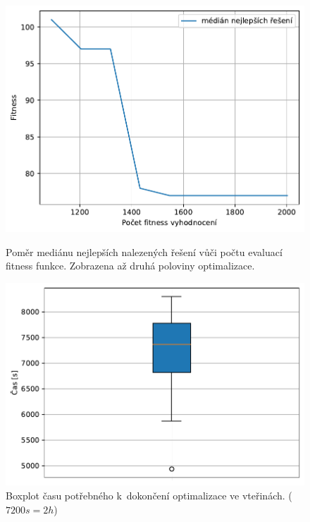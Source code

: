 \begin{figure}[H]
\begin{minipage}[t]{0.475\linewidth}
	\includegraphics[width=\textwidth]{obrazky-figures/statistics/HIFU/blob/4/GA/bestsToFitness_1.pdf}
	\caption{Poměr mediánu nejlepších nalezených řešení vůči počtu evaluací fitness funkce. Zobrazena až druhá poloviny optimalizace.}
	\label{fg:hifu:ga:fitPerf}
\end{minipage}
\hfill
\begin{minipage}[t]{0.475\linewidth}
\includegraphics[width=\linewidth]{obrazky-figures/statistics/HIFU/blob/4/GA/timeBoxplot_WithOutliers.pdf}
\caption{Boxplot času potřebného k~dokončení optimalizace ve vteřinách. ($7200s = 2h$)}
\label{fg:hifu:ga:time}
\end{minipage}
\end{figure}

